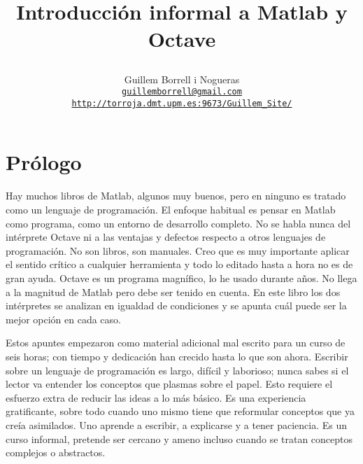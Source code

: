 \documentclass[10pt,fleqn,a4]{book}
\begin{document}
\title{\begin{Huge}Introducción informal a Matlab y Octave\end{Huge}}


\author{Guillem Borrell i Nogueras\\
  \href{mailto:guillemborrell@gmail.com}
  {\texttt{guillemborrell@gmail.com}}\\
  \texttt{\url{http://torroja.dmt.upm.es:9673/Guillem\_Site/}}\\
}

\maketitle

\chapter*{Prólogo}

Hay muchos libros de Matlab, algunos muy buenos, pero en ninguno es
tratado como un lenguaje de programación. El enfoque habitual es
pensar en Matlab como programa, como un entorno de desarrollo
completo. No se habla nunca del intérprete Octave ni a las ventajas y
defectos respecto a otros lenguajes de programación. No son libros,
son manuales.  Creo que es muy importante aplicar el sentido crítico a
cualquier herramienta y todo lo editado hasta a hora no es de gran
ayuda. Octave es un programa magnífico, lo he usado durante años. No
llega a la magnitud de Matlab pero debe ser tenido en cuenta. En este
libro los dos intérpretes se analizan en igualdad de condiciones y se
apunta cuál puede ser la mejor opción en cada caso.

Estos apuntes empezaron como material adicional mal escrito para un
curso de seis horas; con tiempo y dedicación han crecido hasta lo que
son ahora. Escribir sobre un lenguaje de programación es largo,
difícil y laborioso; nunca sabes si el lector va entender los
conceptos que plasmas sobre el papel. Esto requiere el esfuerzo extra
de reducir las ideas a lo más básico. Es una experiencia gratificante,
sobre todo cuando uno mismo tiene que reformular conceptos que ya
creía asimilados. Uno aprende a escribir, a explicarse y a tener
paciencia.  Es un curso informal, pretende ser cercano y ameno incluso
cuando se tratan conceptos complejos o abstractos.
\end{document}
